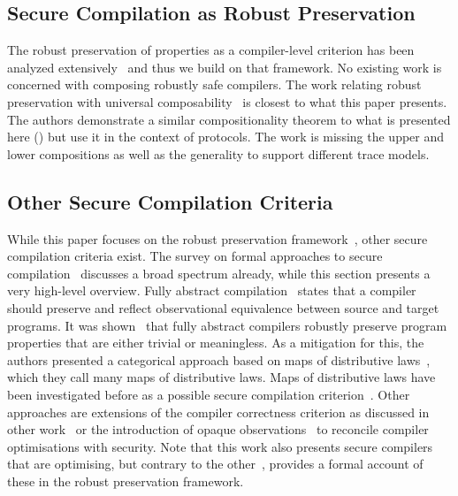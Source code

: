 \documentclass[dvipsnames,conference]{IEEEtran}
\theoremstyle{definition}
\begin{document}
\subsection{Secure Compilation as Robust Preservation}\label{subsec:relw:seccomprtp}

The robust preservation of properties as a compiler-level criterion has been analyzed extensively~\cite{abate2019jour,patrignani2021rsc,abate2021extacc,patrignani2019survey} and thus we build on that framework.
No existing work is concerned with composing robustly safe compilers.
The work relating robust preservation with universal composability~\cite{patrignani2022universal} is closest to what this paper presents.
The authors demonstrate a similar compositionality theorem to what is presented here () but use it in the context of protocols.
The work is missing the upper and lower compositions as well as the generality to support different trace models.

\subsection{Other Secure Compilation Criteria}\label{subsec:relw:seccompcrit}

While this paper focuses on the robust preservation framework~\cite{abate2019jour}, other secure compilation criteria exist.
The survey on formal approaches to secure compilation~\cite{patrignani2019survey} discusses a broad spectrum already, while this section presents a very high-level overview.
Fully abstract compilation~\cite{abadi1999fullabstraction} states that a compiler should preserve and reflect observational equivalence between source and target programs.
It was shown~\cite{abate2021faandrc} that fully abstract compilers robustly preserve program properties that are either trivial or meaningless.
As a mitigation for this, the authors presented a categorical approach based on maps of distributive laws~\cite{watanabe2002modl}, which they call many maps of distributive laws.
Maps of distributive laws have been investigated before as a possible secure compilation criterion~\cite{tsampas2020catsc}.
Other approaches are extensions of the compiler correctness criterion as discussed in other work~\cite{patterson2019next700} or the introduction of opaque observations~\cite{vu2021reconciling} to reconcile compiler optimisations with security.
Note that this work also presents secure compilers that are optimising, but contrary to the other~\cite{vu2021reconciling}, provides a formal account of these in the robust preservation framework.
\end{document}

